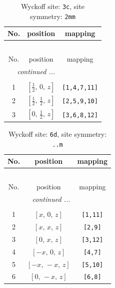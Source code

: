 \documentclass[fleqn,8pt]{jsarticle}
\begin{document}
\begin{longtable}{ccc}
\caption{Wyckoff site: {\tt 3c}, site symmetry: {\tt 2mm}}
 \\
 \hline \hline
No. & position & mapping \\ \hline \endfirsthead

\multicolumn{2}{l}{\tablename\ \thetable{}} \\
 \hline \hline
No. & position & mapping \\ \hline \endhead

 \hline \hline
\multicolumn{2}{r}{\footnotesize\it continued ...} \\ \endfoot

 \hline \hline
\multicolumn{2}{r}{} \\ \endlastfoot

1 & $\left[ \frac{1}{2},\, 0,\, z \right]$ & {\tt [1,4,7,11]} \\ \hline
2 & $\left[ \frac{1}{2},\, \frac{1}{2},\, z \right]$ & {\tt [2,5,9,10]} \\ \hline
3 & $\left[ 0,\, \frac{1}{2},\, z \right]$ & {\tt [3,6,8,12]} \\
\end{longtable}
\renewcommand{\arraystretch}{1.2}
\begin{longtable}{ccc}
\caption{Wyckoff site: {\tt 6d}, site symmetry: {\tt ..m}}
 \\
 \hline \hline
No. & position & mapping \\ \hline \endfirsthead

\multicolumn{2}{l}{\tablename\ \thetable{}} \\
 \hline \hline
No. & position & mapping \\ \hline \endhead

 \hline \hline
\multicolumn{2}{r}{\footnotesize\it continued ...} \\ \endfoot

 \hline \hline
\multicolumn{2}{r}{} \\ \endlastfoot

1 & $\left[ x,\, 0,\, z \right]$ & {\tt [1,11]} \\ \hline
2 & $\left[ x,\, x,\, z \right]$ & {\tt [2,9]} \\ \hline
3 & $\left[ 0,\, x,\, z \right]$ & {\tt [3,12]} \\ \hline
4 & $\left[ - x,\, 0,\, z \right]$ & {\tt [4,7]} \\ \hline
5 & $\left[ - x,\, - x,\, z \right]$ & {\tt [5,10]} \\ \hline
6 & $\left[ 0,\, - x,\, z \right]$ & {\tt [6,8]} \\
\end{longtable}
\end{document}
